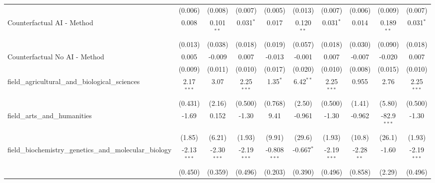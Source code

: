 \begin{tabular}{lccccccccc}
                                                               & (0.006)       & (0.008)       & (0.007)       & (0.005)        & (0.013)      & (0.007)       & (0.006)       & (0.009)        & (0.007)\\   
   Counterfactual AI - Method                                  & 0.008         & 0.101$^{**}$  & 0.031$^{*}$   & 0.017          & 0.120$^{**}$ & 0.031$^{*}$   & 0.014         & 0.189$^{**}$   & 0.031$^{*}$\\   
                                                               & (0.013)       & (0.038)       & (0.018)       & (0.019)        & (0.057)      & (0.018)       & (0.030)       & (0.090)        & (0.018)\\   
   Counterfactual No AI - Method                               & 0.005         & -0.009        & 0.007         & -0.013         & -0.001       & 0.007         & -0.007        & -0.020         & 0.007\\   
                                                               & (0.009)       & (0.011)       & (0.010)       & (0.017)        & (0.020)      & (0.010)       & (0.008)       & (0.015)        & (0.010)\\   
   field\_agricultural\_and\_biological\_sciences              & 2.17$^{***}$  & 3.07          & 2.25$^{***}$  & 1.35$^{*}$     & 6.42$^{**}$  & 2.25$^{***}$  & 0.955         & 2.76           & 2.25$^{***}$\\   
                                                               & (0.431)       & (2.16)        & (0.500)       & (0.768)        & (2.50)       & (0.500)       & (1.41)        & (5.80)         & (0.500)\\   
   field\_arts\_and\_humanities                                & -1.69         & 0.152         & -1.30         & 9.41           & -0.961       & -1.30         & -0.962        & -82.9$^{***}$  & -1.30\\   
                                                               & (1.85)        & (6.21)        & (1.93)        & (9.91)         & (29.6)       & (1.93)        & (10.8)        & (26.1)         & (1.93)\\   
   field\_biochemistry\_genetics\_and\_molecular\_biology      & -2.13$^{***}$ & -2.30$^{***}$ & -2.19$^{***}$ & -0.808$^{***}$ & -0.667$^{*}$ & -2.19$^{***}$ & -2.28$^{**}$  & -1.60          & -2.19$^{***}$\\   
                                                               & (0.450)       & (0.359)       & (0.496)       & (0.203)        & (0.390)      & (0.496)       & (0.858)       & (2.29)         & (0.496)\\   

\end{tabular}
